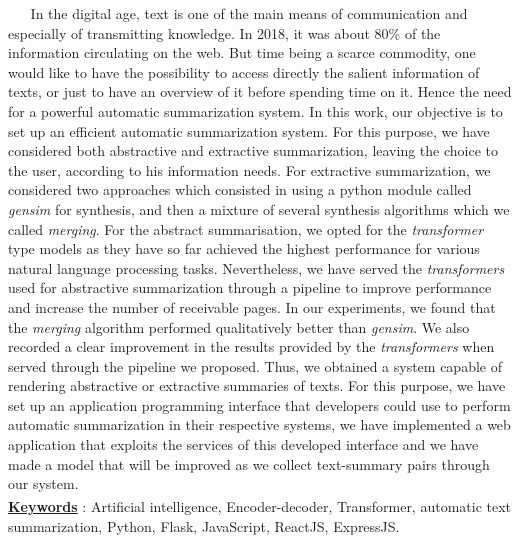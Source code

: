 $ _{} $ $ _{} $ $ _{} $ $ _{} $ $ _{} $In the digital age, text is one of the main means of communication and especially of transmitting knowledge. In 2018, it was about $ 80\% $ of the information circulating on the web. But time being a scarce commodity, one would like to have the possibility to access directly the salient information of texts, or just to have an overview of it before spending time on it. Hence the need for a powerful automatic summarization system.
In this work, our objective is to set up an efficient automatic summarization system. For this purpose, we have considered both abstractive and extractive summarization, leaving the choice to the user, according to his information needs.
For extractive summarization, we considered two approaches which consisted in using a python module called \textit{gensim} for synthesis, and then a mixture of several synthesis algorithms which we called \textit{merging}. For the abstract summarisation, we opted for the \textit{transformer} type models as they have so far achieved the highest performance for various natural language processing tasks. Nevertheless, we have served the \textit{transformers} used for abstractive summarization through a pipeline to improve performance and increase the number of receivable pages.
In our experiments, we found that the \textit{merging} algorithm performed qualitatively better than \textit{gensim}. We also recorded a clear improvement in the results provided by the \textit{transformers} when served through the pipeline we proposed. Thus, we obtained a system capable of rendering abstractive or extractive summaries of texts. For this purpose, we have set up an application programming interface that developers could use to perform automatic summarization in their respective systems, we have implemented a web application that exploits the services of this developed interface and we have made a model that will be improved as we collect text-summary pairs through our system.\\
$ _{ } $\\
\underline{\textbf{Keywords}} : Artificial intelligence, Encoder-decoder, Transformer, automatic text sum\-ma\-ri\-za\-tion, Python, Flask, JavaScript, ReactJS, ExpressJS.